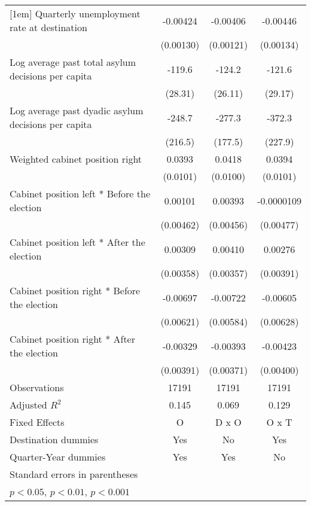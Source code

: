 \begin{table}[htbp]
\begin{tabular}{l*{3}{c}}
[1em]
Quarterly unemployment rate at destination&    -0.00424\sym{**} &    -0.00406\sym{**} &    -0.00446\sym{**} \\
                    &   (0.00130)         &   (0.00121)         &   (0.00134)         \\
[1em]
Log average past total asylum decisions per capita&      -119.6\sym{***}&      -124.2\sym{***}&      -121.6\sym{***}\\
                    &     (28.31)         &     (26.11)         &     (29.17)         \\
[1em]
Log average past dyadic asylum decisions per capita&      -248.7         &      -277.3         &      -372.3         \\
                    &     (216.5)         &     (177.5)         &     (227.9)         \\
[1em]
Weighted cabinet position right&      0.0393\sym{***}&      0.0418\sym{***}&      0.0394\sym{***}\\
                    &    (0.0101)         &    (0.0100)         &    (0.0101)         \\
[1em]
Cabinet position left * Before the election&     0.00101         &     0.00393         &  -0.0000109         \\
                    &   (0.00462)         &   (0.00456)         &   (0.00477)         \\
[1em]
Cabinet position left * After the election&     0.00309         &     0.00410         &     0.00276         \\
                    &   (0.00358)         &   (0.00357)         &   (0.00391)         \\
[1em]
Cabinet position right * Before the election&    -0.00697         &    -0.00722         &    -0.00605         \\
                    &   (0.00621)         &   (0.00584)         &   (0.00628)         \\
[1em]
Cabinet position right * After the election&    -0.00329         &    -0.00393         &    -0.00423         \\
                    &   (0.00391)         &   (0.00371)         &   (0.00400)         \\
\hline
Observations        &       17191         &       17191         &       17191         \\
Adjusted \(R^{2}\)  &       0.145         &       0.069         &       0.129         \\
Fixed Effects       &           O         &       D x O         &       O x T         \\
Destination dummies &         Yes         &          No         &         Yes         \\
Quarter-Year dummies&         Yes         &         Yes         &          No         \\
\hline\hline
\multicolumn{4}{l}{\footnotesize Standard errors in parentheses}\\
\multicolumn{4}{l}{\footnotesize \sym{*} \(p<0.05\), \sym{**} \(p<0.01\), \sym{***} \(p<0.001\)}\\
\end{tabular}
\end{table}
